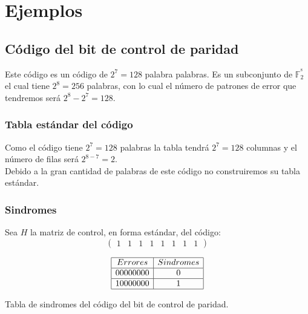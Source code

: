 %
%

\section{Ejemplos}

\subsection{C\'odigo del bit de control de paridad}

Este c\'odigo es un c\'odigo de $2^7=128$ palabra palabras. Es un subconjunto de
$\mathbb{F}^{^8}_2$ el cual tiene $2^8=256$ palabras, con lo cual el n\'umero
de patrones de error que tendremos ser\'a $2^8-2^7=128$.

\subsubsection{Tabla est\'andar del c\'odigo}

Como el c\'odigo tiene $2^7=128$ palabras la tabla tendr\'a $2^7=128$ columnas
y el n\'umero de filas ser\'a $2^{8-7}=2$.\\

Debido a la gran cantidad de palabras de este c\'odigo no construiremos su
tabla est\'andar.

\subsubsection{Sindromes}

Sea $H$ la matriz de control, en forma est\'andar, del c\'odigo:
\begin{displaymath}
\left( \begin{array}{cccccccc}
1&1&1&1&1&1&1&1
\end{array} \right)
\end{displaymath}

\begin{table}[!h]
\begin{displaymath}
\begin{array}{|c|c|}
\hline
Errores & Sindromes \\
\hline
00000000 & 0 \\
\hline
10000000 & 1 \\
\hline
\end{array}
\end{displaymath}
\caption{Tabla de sindromes del c\'odigo del bit de control de paridad.}
\end{table}

